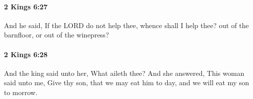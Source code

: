 		\paragraph{2 Kings 6:27} %
			\label{2KINGS-6-27}

			And he said, If the LORD do not help thee, whence shall I help thee? out of the barnfloor, or out of the winepress?


		\paragraph{2 Kings 6:28} %
			\label{2KINGS-6-28}

			And the king said unto her, What aileth thee? And she answered, This woman said unto me, Give thy son, that we may eat him to day, and we will eat my son to morrow.


